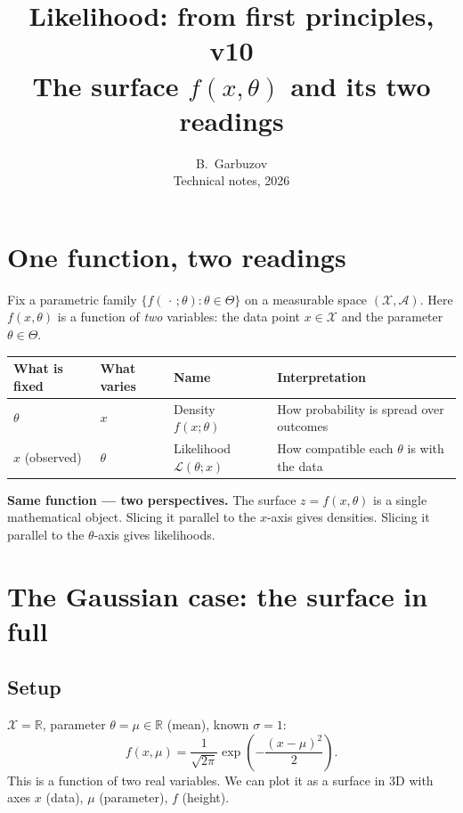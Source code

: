 \documentclass[12pt, a4paper]{article}
\title{\textbf{Likelihood: from first principles, v10}\\
\large The surface $f(x,\theta)$ and its two readings}
\author{B.~Garbuzov\\
{\small Technical notes, 2026}}
\date{}
\theoremstyle{definition}
\theoremstyle{remark}
\newcommand{\R}{\mathbb{R}}
\newcommand{\cL}{\mathcal{L}}
\begin{document}
\maketitle
\tableofcontents
\newpage

\section{One function, two readings}

Fix a parametric family $\{f(\,\cdot\,;\theta) : \theta \in \Theta\}$
on a measurable space $(\mathcal{X}, \mathcal{A})$.
Here $f(x, \theta)$ is a function of \emph{two} variables:
the data point $x \in \mathcal{X}$ and the parameter
$\theta \in \Theta$.

\begin{center}
\renewcommand{\arraystretch}{1.4}
\begin{tabular}{llll}
\hline
What is fixed & What varies & Name & Interpretation \\
\hline
$\theta$ & $x$ & Density $f(x;\theta)$
  & How probability is spread over outcomes \\
$x$ (observed) & $\theta$ & Likelihood $\cL(\theta;x)$
  & How compatible each $\theta$ is with the data \\
\hline
\end{tabular}
\end{center}

\bigskip
\noindent
\textbf{Same function --- two perspectives.}
The surface $z = f(x,\theta)$ is a single mathematical object.
Slicing it parallel to the $x$-axis gives densities.
Slicing it parallel to the $\theta$-axis gives likelihoods.

\section{The Gaussian case: the surface in full}

\subsection{Setup}

$\mathcal{X} = \R$, parameter $\theta = \mu \in \R$
(mean), known $\sigma = 1$:
\[
  f(x, \mu)
  = \frac{1}{\sqrt{2\pi}}
    \exp\!\left(-\frac{(x-\mu)^2}{2}\right).
\]
This is a function of two real variables.  We can plot it as a
surface in 3D with axes $x$ (data), $\mu$ (parameter),
$f$ (height).
\end{document}
